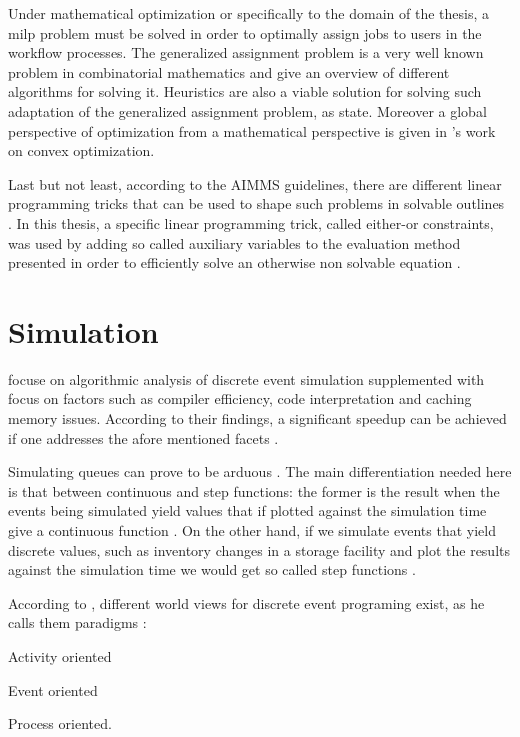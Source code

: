 Under mathematical optimization or specifically to the domain of the thesis, a \gls{milp} problem must be solved in order to optimally assign jobs to users in the workflow processes. The generalized assignment problem is a very well known problem in combinatorial mathematics and \citet{Cattrysse1992} give an overview of different algorithms for solving it. Heuristics are also a viable solution for solving such adaptation of the generalized assignment problem, as \citet{Racer1994} state. Moreover a global perspective of optimization from a mathematical perspective is given in \citet{Boyd2004}'s work on convex optimization.

Last but not least, according to the AIMMS guidelines, there are different linear programming tricks that can be used to shape such problems in solvable outlines \citep{Bisschop2016}. In this thesis, a specific linear programming trick, called either-or constraints, was used by adding so called auxiliary variables to the evaluation method presented in order to efficiently solve an otherwise non solvable equation \citep[p. 77]{Bisschop2016}.

\section{Simulation}

\citet{Bahouth2007} focuse on algorithmic analysis of discrete event simulation supplemented with focus on factors such as compiler efficiency, code interpretation and caching memory issues. According to their findings, a significant speedup can be achieved if one addresses the afore mentioned facets \citep{Bahouth2007}.

Simulating queues can prove to be arduous \citep{Matloff2008}. The main differentiation needed here is that between continuous and step functions: the former is the result when the events being simulated yield values that if plotted against the simulation time give a continuous function \citep{Matloff2008}. On the other hand, if we simulate events that yield discrete values, such as inventory changes in a storage facility and plot the results against the simulation time we would get so called step functions \citep{Matloff2008}.

According to \citet{Matloff2008}, different world views for discrete event programing exist, as he calls them paradigms \citep{Matloff2008}:
\begin{enumerate*}
	\item Activity oriented
	\item Event oriented
	\item Process oriented.
\end{enumerate*}

